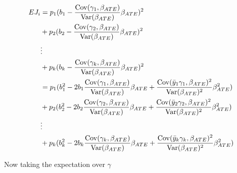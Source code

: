 \begin{align*}
	E J_i 
	&=  p_1 ( b_1 -  \frac{\mathrm{Cov}(\gamma_1, \beta_{ATE})}{\mathrm{Var}(\beta_{ATE})} \beta_{ATE})^2 \\
	& + p_2 ( b_2  - \frac{\mathrm{Cov}(\gamma_2, \beta_{ATE})}{\mathrm{Var}(\beta_{ATE})} \beta_{ATE})^2 \\
	&\vdots \\
	&+ p_k  ( b_k  - \frac{\mathrm{Cov}(\gamma_k, \beta_{ATE})}{\mathrm{Var}(\beta_{ATE})} \beta_{ATE})^2 \\
	&=  p_1 ( b_1^2 - 2 b_1\frac{\mathrm{Cov}(\gamma_1, \beta_{ATE})}{\mathrm{Var}(\beta_{ATE})} \beta_{ATE} + \frac{\mathrm{Cov}(\bar{y}_1 \gamma_1, \beta_{ATE})^2}{\mathrm{Var}(\beta_{ATE})^2} \beta_{ATE}^2) \\
	& + p_2 ( b_2^2 - 2 b_2\frac{\mathrm{Cov}(\gamma_2, \beta_{ATE})}{\mathrm{Var}(\beta_{ATE})} \beta_{ATE} + \frac{\mathrm{Cov}(\bar{y}_2 \gamma_2, \beta_{ATE})^2}{\mathrm{Var}(\beta_{ATE})^2} \beta_{ATE}^2) \\
	&\vdots \\                                                                                                                        
	&+ p_k  ( b_k^2 - 2 b_k\frac{\mathrm{Cov}(\gamma_k, \beta_{ATE})}{\mathrm{Var}(\beta_{ATE})} \beta_{ATE} + \frac{\mathrm{Cov}(\bar{y}_k \gamma_k, \beta_{ATE})^2}{\mathrm{Var}(\beta_{ATE})^2} \beta_{ATE}^2) \\
\end{align*}

Now taking the expectation over $\gamma$

